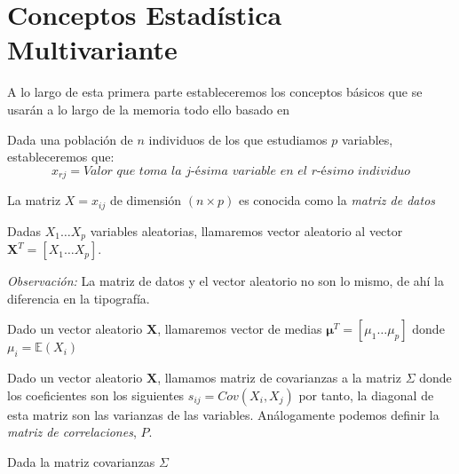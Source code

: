 \chapter{Conceptos Estadística Multivariante}

A lo largo de esta primera parte estableceremos los conceptos básicos que se usarán a lo largo de la memoria todo ello basado en \cite{Chatfield 1989}



\begin{defi}
Dada una población de $n$ individuos de los que estudiamos $p$ variables, estableceremos que:
$$
x_{rj}=\textit{Valor que toma la j-ésima variable en el r-ésimo individuo}
$$
\end{defi}

\begin{defi}
La matriz $X=x_{ij}$ de dimensión $(n \times p)$ es conocida como la \textit{matriz de datos}
\end{defi}

\begin{defi}
Dadas $X_1\ldots X_p$ variables aleatorias, llamaremos vector aleatorio al vector $\textbf{X}^T=[X_1 \ldots X_p]$.
\end{defi}

\noindent \textit{Observación: } La matriz de datos y el vector aleatorio no son lo mismo, de ahí la diferencia en la tipografía. 

\begin{defi}
Dado un vector aleatorio $\textbf{X}$, llamaremos vector de medias $\mathbf{\mu}^T=[\mu_1\ldots \mu_p]$ donde $\mu_i=\mathbb{E}(X_i)$
\end{defi}

\begin{defi}
Dado un vector aleatorio $\textbf{X}$, llamamos matriz de covarianzas a la matriz $\Sigma $ donde los coeficientes son los siguientes $s_{ij}=Cov(X_i,X_j)$ por tanto, la diagonal de esta matriz son las varianzas de las variables. Análogamente podemos definir la \textit{matriz de correlaciones}, $P$. 
\end{defi}

\begin{propo}
Dada la matriz covarianzas $\Sigma$
\end{propo}
